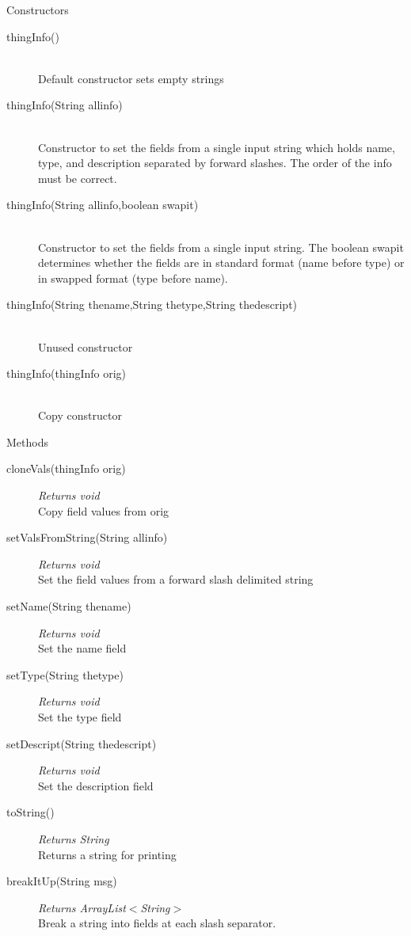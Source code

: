 \documentclass[11pt,a4paper]{article}
\newenvironment{di}
{\begin{flushright}
\begin{minipage}{0.95\textwidth}
\begin{description}
}
{\end{description}
\end{minipage}
\end{flushright}
}
\begin{document}
\noindent\colorbox{conbg}{\parbox{1.0\textwidth}{\Large{Constructors}}}
\begin{di}
\item[{thingInfo()}]\qquad\\
Default constructor sets empty strings
\item[{thingInfo(String allinfo)}]\qquad\\
Constructor to set the fields from a single input string which holds name, type, and description separated by forward slashes. The order of the info must be correct.
\item[{thingInfo(String allinfo,boolean swapit)}]\qquad\\
Constructor to set the fields from a single input string. The boolean swapit determines whether the fields are in standard format (name before type) or in swapped format (type before name).
\item[{thingInfo(String thename,String thetype,String thedescript)}]\qquad\\
Unused constructor
\item[{thingInfo(thingInfo orig)}]\qquad\\
Copy constructor
\end{di}
\colorbox{descriptbg}{\parbox{1.0\textwidth}{\Large{Methods}}}
\begin{di}
\item[{cloneVals(thingInfo orig)}]\emph{Returns void}\\
Copy field values from orig\\
\item[{setValsFromString(String allinfo)}]\emph{Returns void}\\
Set the field values from a forward slash delimited string\\
\item[{setName(String thename)}]\emph{Returns void}\\
Set the name field\\
\item[{setType(String thetype)}]\emph{Returns void}\\
Set the type field\\
\item[{setDescript(String thedescript)}]\emph{Returns void}\\
Set the description field\\
\item[{toString()}]\emph{Returns String}\\
Returns a string for printing\\
\item[{breakItUp(String msg)}]\emph{Returns ArrayList$<$String$>$}\\
Break a string into fields at each slash separator.\\
\end{di}
\end{document}
